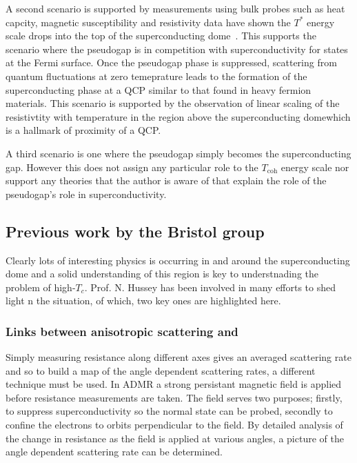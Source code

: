A second scenario is supported by measurements using bulk probes such as heat capcity, magnetic susceptibility and resistivity data have shown the $T^*$ energy scale drops into the top of the superconducting dome~\cite{Tallon2001}. This supports the scenario where the pseudogap is in competition with superconductivity for states at the Fermi surface. Once the pseudogap phase is suppressed, scattering from quantum fluctuations at zero temeprature leads to the formation of the superconducting phase at a \ac{QCP} similar to that found in heavy fermion materials. This scenario is supported by the observation of linear scaling of the resistivtity with temperature in the region above the superconducting domewhich is a hallmark of proximity of a \ac{QCP}.

A third scenario is one where the pseudogap simply becomes the superconducting gap. However this does not assign any particular role to the $T_{\textrm{coh}}$ energy scale nor support any theories that the author is aware of that explain the role of the pseudogap's role in superconductivity.

\subsection{Previous work by the Bristol group}

Clearly lots of interesting physics is occurring in and around the superconducting dome and a solid understanding of this region is key to understnading the problem of high-$T_c$. Prof. N. Hussey has been involved in many efforts to shed light n the situation, of which, two key ones are highlighted here.

\subsubsection{Links between anisotropic scattering and \Tc}

Simply measuring resistance along different axes gives an averaged scattering rate and so to build a map of the angle dependent scattering rates, a different technique must be used. In \ac{ADMR} a strong persistant magnetic field is applied before resistance measurements are taken. The field serves two purposes; firstly, to suppress superconductivity so the normal state can be probed, secondly to confine the electrons to orbits perpendicular to the field. By detailed analysis of the change in resistance as the field is applied at various angles, a picture of the angle dependent scattering rate can be determined.


